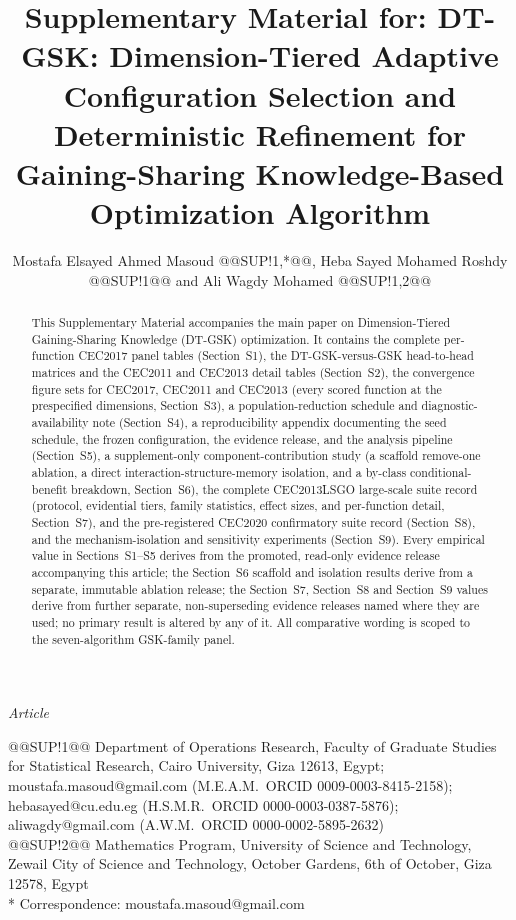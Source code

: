 \documentclass[10pt,a4paper]{article}
\title{Supplementary Material for: DT-GSK: Dimension-Tiered Adaptive Configuration Selection and Deterministic Refinement for Gaining-Sharing Knowledge-Based Optimization Algorithm}
\author{Mostafa Elsayed Ahmed Masoud @@SUP!1,*@@, Heba Sayed Mohamed Roshdy @@SUP!1@@ and Ali Wagdy Mohamed @@SUP!1,2@@}
\date{}
\newcommand{\dtgsk}{DT-GSK}
\begin{document}
\noindent\textit{Article}

\maketitle

\begin{center}\footnotesize
@@SUP!1@@ \quad Department of Operations Research, Faculty of Graduate Studies for
Statistical Research, Cairo University, Giza 12613, Egypt;
moustafa.masoud@gmail.com (M.E.A.M.\ ORCID 0009-0003-8415-2158); hebasayed@cu.edu.eg (H.S.M.R.\ ORCID 0000-0003-0387-5876); aliwagdy@gmail.com (A.W.M.\ ORCID 0000-0002-5895-2632)\\
@@SUP!2@@ \quad Mathematics Program, University of Science and Technology,
Zewail City of Science and Technology, October Gardens, 6th of October,
Giza 12578, Egypt\\
* Correspondence: moustafa.masoud@gmail.com
\end{center}

\begin{abstract}
This Supplementary Material accompanies the main paper on
Dimension-Tiered Gaining-Sharing Knowledge (\dtgsk{})
optimization.  It contains the complete per-function CEC2017 panel
tables (Section~S1), the \dtgsk{}-versus-GSK head-to-head matrices and the
CEC2011 and CEC2013 detail tables (Section~S2), the convergence
figure sets for CEC2017, CEC2011 and CEC2013 (every scored function at the
prespecified dimensions, Section~S3), a population-reduction schedule
and diagnostic-availability note (Section~S4), a reproducibility appendix documenting
the seed schedule, the frozen configuration, the evidence release, and
the analysis pipeline (Section~S5), a supplement-only
component-contribution study (a scaffold remove-one ablation, a
direct interaction-structure-memory isolation, and a by-class conditional-benefit
breakdown, Section~S6), the complete CEC2013LSGO large-scale suite record
(protocol, evidential tiers, family statistics, effect sizes, and
per-function detail, Section~S7), and the pre-registered CEC2020
confirmatory suite record (Section~S8), and the mechanism-isolation and
sensitivity experiments (Section~S9).  Every empirical value in Sections~S1--S5 derives from the
promoted, read-only evidence release accompanying this article;
the Section~S6 scaffold and isolation results derive from a separate, immutable
ablation release; the Section~S7, Section~S8 and Section~S9 values derive from
further separate, non-superseding evidence releases named where they are used;
no primary result is
altered by any of it.  All comparative
wording is scoped to the seven-algorithm GSK-family panel.
\end{abstract}
\end{document}
